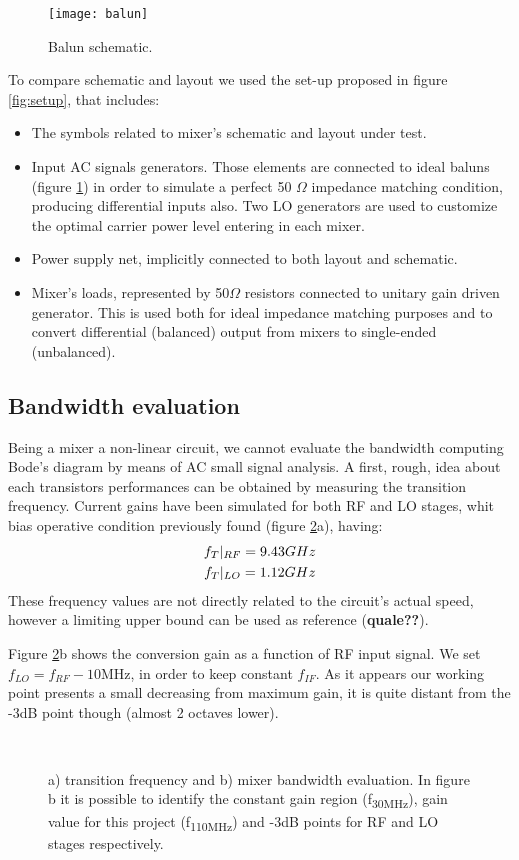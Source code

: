 \begin{figure}[H]
	\centering
	\texttt{[image: balun]}
	\caption{Balun schematic.}
	\label{fig:balun}
\end{figure}
To compare schematic and layout we used the set-up proposed in figure \ref{fig:setup}, that includes:
\begin{itemize}
	\item The symbols related to mixer's schematic and layout under test.
	\item Input AC signals generators. Those elements are connected to ideal baluns (figure \ref{fig:balun}) in order to simulate a perfect 50 \(\Omega\) impedance matching condition, producing differential inputs also. Two LO generators are used to customize the optimal carrier power level entering in each mixer.
	\item Power supply net, implicitly connected to both layout and schematic.
	\item Mixer's loads, represented by 50\(\Omega\) resistors connected to unitary gain driven generator. This is used both for ideal impedance matching purposes and to convert differential (balanced) output from mixers to single-ended (unbalanced).
\end{itemize}

\subsection{Bandwidth evaluation}

Being a mixer a non-linear circuit, we cannot evaluate the bandwidth computing Bode's diagram by means of AC small signal analysis. 
A first, rough, idea about each transistors performances can be obtained by measuring the transition frequency. Current gains have been simulated for both RF and LO stages, whit bias operative condition previously found (figure \ref{fig:bandwidth}a), having:
\begin{gather}
f_T|_{RF}=9.43GHz \notag \\
f_T|_{LO}=1.12GHz \notag 
\end{gather}  
These frequency values are not directly related to the circuit's actual speed, however a limiting upper bound can be used as reference (\textbf{quale??}). 

Figure \ref{fig:bandwidth}b shows the conversion gain as a function of RF input signal. We set \(f_{LO}=f_{RF}-10\)MHz, in order to keep constant \(f_{IF}\). As it appears our working point presents a small decreasing from maximum gain, it is quite distant from the -3dB point though (almost 2 octaves lower).
\begin{figure}[H] 
	\centering
	 \\
	\caption{a) transition frequency and b) mixer bandwidth evaluation. In figure b it is possible to identify the constant gain region (f\textsubscript{30MHz}), gain value for this project (f\textsubscript{110MHz})  and -3dB points for RF and LO stages respectively.}
	\label{fig:bandwidth}
\end{figure}


